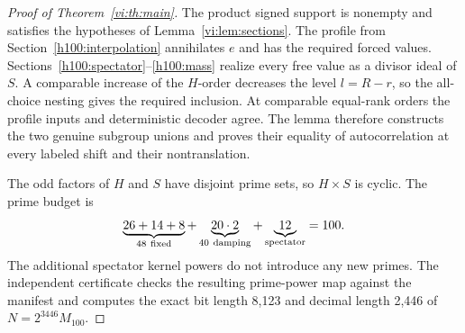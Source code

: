 \begin{proof}[Proof of Theorem~\ref{vi:th:main}]
The product signed support is nonempty and satisfies the hypotheses of Lemma~\ref{vi:lem:sections}. The profile from Section~\ref{h100:interpolation} annihilates $e$ and has the required forced values. Sections~\ref{h100:spectator}--\ref{h100:mass} realize every free value as a divisor ideal of $S$. A comparable increase of the $H$-order decreases the level $l=R-r$, so the all-choice nesting gives the required inclusion. At comparable equal-rank orders the profile inputs and deterministic decoder agree. The lemma therefore constructs the two genuine subgroup unions and proves their equality of autocorrelation at every labeled shift and their nontranslation.

The odd factors of $H$ and $S$ have disjoint prime sets, so $H\times S$ is cyclic. The prime budget is
\[
 \underbrace{26+14+8}_{48\ {\rm fixed}}
 +\underbrace{20\cdot2}_{40\ {\rm damping}}
 +\underbrace{12}_{\rm spectator}=100.
\]
The additional spectator kernel powers do not introduce any new primes. The independent certificate checks the resulting prime-power map against the manifest and computes the exact bit length 8,123 and decimal length 2,446 of $N=2^{3446}M_{100}$.
\end{proof}

